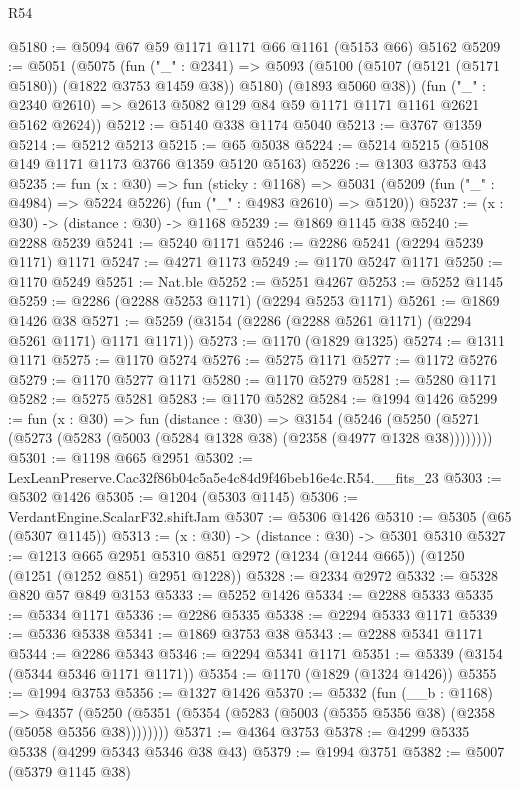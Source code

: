 \begin{lexlean}{R54}
\begin{coremodule}
@5180 := @5094 @67 @59 @1171 @1171 @66 @1161 (@5153 @66) @5162
@5209 := @5051
    (@5075
      (fun ("_" : @2341) =>
      @5093 (@5100 (@5107 (@5121 (@5171 @5180)) (@1822 @3753 @1459 @38)) @5180) (@1893 @5060 @38))
      (fun ("_" : @2340 @2610) => @2613 @5082 @129 @84 @59 @1171 @1171 @1161 @2621 @5162 @2624))
@5212 := @5140 @338 @1174 @5040
@5213 := @3767 @1359
@5214 := @5212 @5213
@5215 := @65 @5038
@5224 := @5214 @5215 (@5108 @149 @1171 @1173 @3766 @1359 @5120 @5163)
@5226 := @1303 @3753 @43
@5235 := fun (x : @30) =>
  fun (sticky : @1168) =>
  @5031 (@5209 (fun ("_" : @4984) => @5224 @5226) (fun ("_" : @4983 @2610) => @5120))
@5237 := (x : @30) -> (distance : @30) -> @1168
@5239 := @1869 @1145 @38
@5240 := @2288 @5239
@5241 := @5240 @1171
@5246 := @2286 @5241 (@2294 @5239 @1171) @1171
@5247 := @4271 @1173
@5249 := @1170 @5247 @1171
@5250 := @1170 @5249
@5251 := Nat.ble
@5252 := @5251 @4267
@5253 := @5252 @1145
@5259 := @2286 (@2288 @5253 @1171) (@2294 @5253 @1171)
@5261 := @1869 @1426 @38
@5271 := @5259 (@3154 (@2286 (@2288 @5261 @1171) (@2294 @5261 @1171) @1171 @1171))
@5273 := @1170 (@1829 @1325)
@5274 := @1311 @1171
@5275 := @1170 @5274
@5276 := @5275 @1171
@5277 := @1172 @5276
@5279 := @1170 @5277 @1171
@5280 := @1170 @5279
@5281 := @5280 @1171
@5282 := @5275 @5281
@5283 := @1170 @5282
@5284 := @1994 @1426
@5299 := fun (x : @30) =>
  fun (distance : @30) =>
  @3154 (@5246 (@5250 (@5271 (@5273 (@5283 (@5003 (@5284 @1328 @38) (@2358 (@4977 @1328 @38))))))))
@5301 := @1198 @665 @2951
@5302 := LexLeanPreserve.Cac32f86b04c5a5e4c84d9f46beb16e4c.R54.__fits_23
@5303 := @5302 @1426
@5305 := @1204 (@5303 @1145)
@5306 := VerdantEngine.ScalarF32.shiftJam
@5307 := @5306 @1426
@5310 := @5305 (@65 (@5307 @1145))
@5313 := (x : @30) -> (distance : @30) -> @5301 @5310
@5327 := @1213
    @665
    @2951
    @5310
    @851
    @2972
    (@1234 (@1244 @665))
    (@1250 (@1251 (@1252 @851) @2951 @1228))
@5328 := @2334 @2972
@5332 := @5328 @820 @57 @849 @3153
@5333 := @5252 @1426
@5334 := @2288 @5333
@5335 := @5334 @1171
@5336 := @2286 @5335
@5338 := @2294 @5333 @1171
@5339 := @5336 @5338
@5341 := @1869 @3753 @38
@5343 := @2288 @5341 @1171
@5344 := @2286 @5343
@5346 := @2294 @5341 @1171
@5351 := @5339 (@3154 (@5344 @5346 @1171 @1171))
@5354 := @1170 (@1829 (@1324 @1426))
@5355 := @1994 @3753
@5356 := @1327 @1426
@5370 := @5332
    (fun (__b : @1168) =>
    @4357 (@5250 (@5351 (@5354 (@5283 (@5003 (@5355 @5356 @38) (@2358 (@5058 @5356 @38))))))))
@5371 := @4364 @3753
@5378 := @4299 @5335 @5338 (@4299 @5343 @5346 @38 @43)
@5379 := @1994 @3751
@5382 := @5007 (@5379 @1145 @38)

\end{coremodule}
\end{lexlean}
